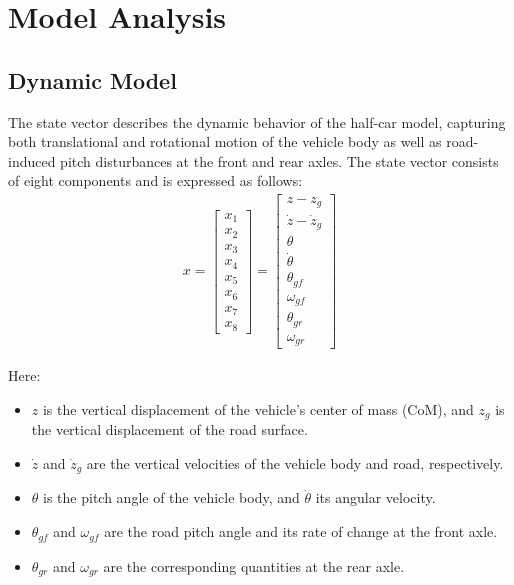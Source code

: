 \documentclass[]{report}
\begin{document}
	\section{Model Analysis}
	\subsection{Dynamic Model}
	
	The state vector describes the dynamic behavior of the half-car model, capturing both translational and rotational motion of the vehicle body as well as road-induced pitch disturbances at the front and rear axles. The state vector consists of eight components and is expressed as follows:
	\begin{align}
		x = \begin{bmatrix}
			x_1 \\ x_2 \\ x_3 \\ x_4 \\ x_5 \\ x_6 \\ x_7 \\ x_8
		\end{bmatrix} =
		\begin{bmatrix}
			z - z_g \\
			\dot{z} - \dot{z}_g \\
			\theta \\
			\dot{\theta} \\
			\theta_{gf} \\
			\omega_{gf} \\
			\theta_{gr} \\
			\omega_{gr}
		\end{bmatrix}
	\end{align}
	
	Here:
	\begin{itemize}
		\item $z$ is the vertical displacement of the vehicle’s center of mass (CoM), and $z_g$ is the vertical displacement of the road surface.
		\item $\dot{z}$ and $\dot{z}_g$ are the vertical velocities of the vehicle body and road, respectively.
		\item $\theta$ is the pitch angle of the vehicle body, and $\dot{\theta}$ its angular velocity.
		\item $\theta_{gf}$ and $\omega_{gf}$ are the road pitch angle and its rate of change at the front axle.
		\item $\theta_{gr}$ and $\omega_{gr}$ are the corresponding quantities at the rear axle.
	\end{itemize}
	
\end{document}
